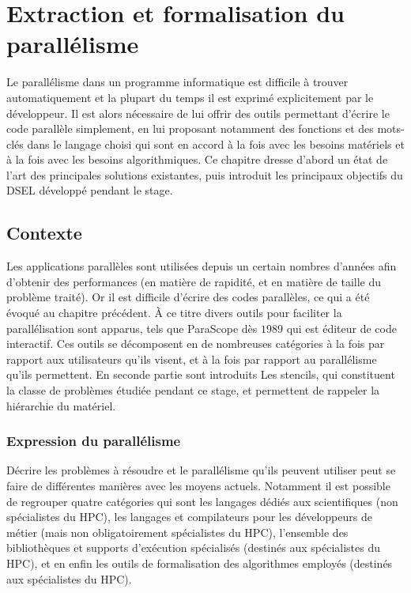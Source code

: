 
\chapter{Extraction et formalisation du parallélisme}

Le parallélisme dans un programme informatique est difficile à trouver automatiquement et la plupart du temps il est exprimé explicitement par le développeur. Il est alors nécessaire de lui offrir des outils permettant d'écrire le code parallèle simplement, en lui proposant notamment des fonctions et des mots-clés dans le langage choisi qui sont en accord à la fois avec les besoins matériels et à la fois avec les besoins algorithmiques. Ce chapitre dresse d'abord un état de l'art des principales solutions existantes, puis introduit les principaux objectifs du DSEL développé pendant le stage.

\section{Contexte}

Les applications parallèles sont utilisées depuis un certain nombres d'années afin d'obtenir des performances (en matière de rapidité, et en matière de taille du problème traité). Or il est difficile d'écrire des codes parallèles, ce qui a été évoqué au chapitre précédent. À ce titre divers outils pour faciliter la parallélisation sont apparus, tels que \textsf{ParaScope} dès $1989$ \cite{Art24} qui est éditeur de code interactif. Ces outils se décomposent en de nombreuses catégories à la fois par rapport aux utilisateurs qu'ils visent, et à la fois par rapport au parallélisme qu'ils permettent. En seconde partie sont introduits Les stencils, qui constituent la classe de problèmes étudiée pendant ce stage, et permettent de rappeler la hiérarchie du matériel. 

\subsection{Expression du parallélisme}

Décrire les problèmes à résoudre et le parallélisme qu'ils peuvent utiliser peut se faire de différentes manières avec les moyens actuels. Notamment il est possible de regrouper quatre catégories qui sont les langages dédiés aux scientifiques (non spécialistes du HPC), les langages et compilateurs pour les développeurs de métier (mais non obligatoirement spécialistes du HPC), l'ensemble des bibliothèques et supports d'exécution spécialisés (destinés aux spécialistes du HPC), et en enfin les outils de formalisation des algorithmes employés (destinés aux spécialistes du HPC).

